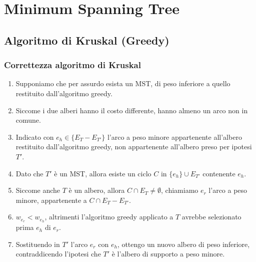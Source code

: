 \documentclass[../template]{subfiles}
\begin{document}
\section{Minimum Spanning Tree}
\subsection{Algoritmo di Kruskal (Greedy)}
\begin{center}
\end{center}

\subsubsection{Correttezza algoritmo di Kruskal}
\begin{enumerate}
    \item Supponiamo che per assurdo esista un MST, di peso inferiore a quello restituito dall'algoritmo greedy.
    \item Siccome i due alberi hanno il costo differente, hanno almeno un arco non in comune.
    \item Indicato con $e_h \in \{E_T - E_{T'}\}$ l'arco a peso minore appartenente all'albero restituito dall'algoritmo
        greedy, non appartenente all'albero preso per ipotesi $T'$.
    \item Dato che $T'$ è un MST, allora esiste un ciclo $C$ in $\{e_h\} \cup E_{T'}$ contenente $e_h$.
    \item Siccome anche $T$ è un albero, allora $C \cap E_{T} \neq \emptyset$, chiamiamo $e_r$ l'arco a peso minore,
        appartenente a $C \cap E_T - E_{T'}$.
    \item $w_{e_r} < w_{e_h}$, altrimenti l'algoritmo greedy applicato a $T$ avrebbe selezionato prima $e_h$ di $e_r$.
    \item Sostituendo in $T'$ l'arco $e_r$ con $e_h$, ottengo un nuovo albero di peso inferiore, contraddicendo l'ipotesi che
        $T'$ è l'albero di supporto a peso minore.
\end{enumerate}
\end{document}
